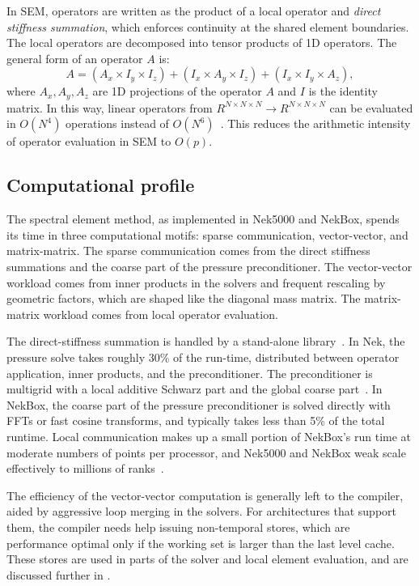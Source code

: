 In SEM, operators are written as the product of a local operator and \textit{direct stiffness summation}, which enforces continuity at the shared element boundaries.
The local operators are decomposed into tensor products of 1D operators.
The general form of an operator $A$ is:
\begin{equation}
A = (A_x \times I_y \times I_z) + (I_x \times A_y \times I_z) + (I_x \times I_y \times A_z),
\end{equation}
where $A_x, A_y, A_z$ are 1D projections of the operator $A$ and $I$ is the
identity matrix.
In this way, linear operators from $R^{N \times N \times N} \rightarrow R^{N \times N \times N}$ can be evaluated in $O(N^4)$ operations instead of $O(N^6)$~\cite{tufo1999terascale}.
This reduces the arithmetic intensity of operator evaluation in SEM to $O(p)$.

\subsection{Computational profile}
The spectral element method, as implemented in Nek5000 and NekBox, spends its time in three computational motifs: sparse communication, vector-vector, and matrix-matrix.
The sparse communication comes from the direct stiffness summations and the coarse part of the pressure preconditioner.
The vector-vector workload comes from inner products in the solvers and frequent rescaling by geometric factors, which are shaped like the diagonal mass matrix.
The matrix-matrix workload comes from local operator evaluation.

The direct-stiffness summation is handled by a stand-alone library~\cite{ivanov2015evaluation,otten2016}. 
In Nek, the pressure solve takes roughly 30\% of the run-time, distributed between operator application, inner products, and the preconditioner.
The preconditioner is multigrid with a local additive Schwarz part and the global coarse part~\cite{lottes2005hybrid}.
In NekBox, the coarse part of the pressure preconditioner is solved directly with FFTs or fast cosine transforms, and typically takes less than 5\% of the total runtime.
Local communication makes up a small portion of NekBox's run time at moderate numbers of points per processor, and Nek5000 and NekBox weak scale effectively to millions of ranks~\cite{hutchinson2015direct}.

The efficiency of the vector-vector computation is generally left to the compiler, aided by aggressive loop merging in the solvers.
For architectures that support them, the compiler needs help issuing non-temporal stores, which are performance optimal only if the working set is larger than the last level cache.
These stores are used in parts of the solver and local element evaluation, and are discussed further in .

